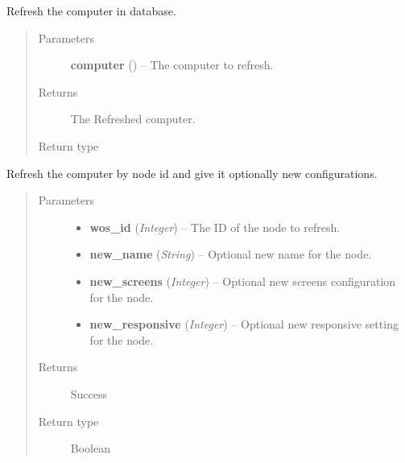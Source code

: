 \documentclass[letterpaper,10pt,english]{sphinxmanual}
\begin{document}

\begin{fulllineitems}
\label{controller:controller.computer.refresh_computer}
Refresh the computer in database.
\begin{quote}\begin{description}
\item[{Parameters}] \leavevmode
\textbf{computer} ({\hyperref[models:models.Computer]{}}) -- The computer to refresh.

\item[{Returns}] \leavevmode
The Refreshed computer.

\item[{Return type}] \leavevmode
{\hyperref[models:models.Computer]{}}

\end{description}\end{quote}

\end{fulllineitems}


\begin{fulllineitems}
\label{controller:controller.computer.refresh_computer_by_wos_id}
Refresh the computer by node id and give it optionally new configurations.
\begin{quote}\begin{description}
\item[{Parameters}] \leavevmode\begin{itemize}
\item {} 
\textbf{wos\_id} (\emph{Integer}) -- The ID of the node to refresh.

\item {} 
\textbf{new\_name} (\emph{String}) -- Optional new name for the node.

\item {} 
\textbf{new\_screens} (\emph{Integer}) -- Optional new screens configuration for the node.

\item {} 
\textbf{new\_responsive} (\emph{Integer}) -- Optional new responsive setting for the node.

\end{itemize}

\item[{Returns}] \leavevmode
Success

\item[{Return type}] \leavevmode
Boolean

\end{description}\end{quote}

\end{fulllineitems}
\end{document}

